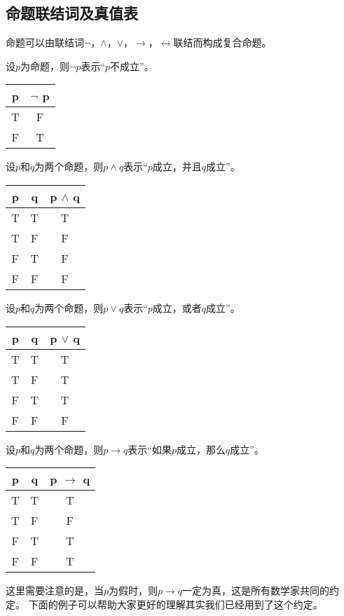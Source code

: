 \documentclass{article}
\begin{document}
\begin{CJK}{UTF8}{gbsn}
\section{命题联结词及真值表}
命题可以由联结词$\lnot$，$\land$，$\lor$，$\to$，$\leftrightarrow$联结而构成复合命题。

设$p$为命题，则$\lnot p$表示“$p$不成立”。

 \begin{tabular}{c|c}
    p& $\lnot$ p\\
    \hline
    T&F\\
    F&T\\
  \end{tabular}

  设$p$和$q$为两个命题，则$p\land q$表示“$p$成立，并且$q$成立”。
  
  \begin{tabular}{cc|c}
    p& q& p $\land$ q\\
    \hline
    T&T&T\\
    T&F&F\\
    F&T&F\\
    F&F&F\\
  \end{tabular}

  设$p$和$q$为两个命题，则$p\lor q$表示“$p$成立，或者$q$成立”。
  
  \begin{tabular}{cc|c}
    p& q& p $\lor$ q\\
    \hline
    T&T&T\\
    T&F&T\\
    F&T&T\\
    F&F&F\\
  \end{tabular}

设$p$和$q$为两个命题，则$p\to q$表示“如果$p$成立，那么$q$成立”。  

    \begin{tabular}{cc|c}
    p& q& p $\to$ q\\
    \hline
    T&T&T\\
    T&F&F\\
    F&T&T\\
    F&F&T\\
    \end{tabular}\hspace{0.87cm}

    这里需要注意的是，当$p$为假时，则$p\to q$一定为真，这是所有数学家共同的约定。
    下面的例子可以帮助大家更好的理解其实我们已经用到了这个约定。


\end{CJK}
\end{document}
